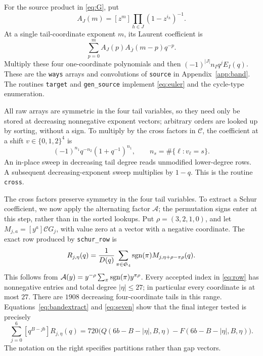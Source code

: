 For the source product in \eqref{eq:G}, put
\[
 A_J(m)=[z^m]\prod_{h\in J}(1-z^{i_h})^{-1}.
\]
At a single tail-coordinate exponent \(m\), its Laurent coefficient is
\[
          \sum_{p=0}^m A_J(p)A_{\bar J}(m-p)q^{-p}.
\]
Multiply these four one-coordinate polynomials and then
\((-1)^{|J|}n_Iq^jE_I(q)\). These are the \texttt{ways} arrays and
convolutions of \texttt{source} in Appendix~\ref{app:band}.
The routines \texttt{target} and \texttt{gen\_source} implement
\eqref{eq:euler} and the cycle-type enumeration.

All raw arrays are symmetric in the four tail variables, so they need
only be stored at decreasing nonnegative exponent vectors; arbitrary
orders are looked up by sorting, without a sign.
To multiply by the cross factors in \(\mathcal C\), the coefficient
at a shift \(v\in\{0,1,2\}^4\) is
\[
                  (-1)^{n_1}q^{-n_2}(1+q^{-1})^{n_1},
       \qquad n_s=\#\{\ell:v_\ell=s\}.
\]
An in-place sweep in decreasing tail degree reads unmodified lower-degree
rows. A subsequent decreasing-exponent sweep multiplies by \(1-q\).
This is the routine \texttt{cross}.

The cross factors preserve symmetry in the four tail variables. To
extract a Schur coefficient, we now apply the alternating factor
\(\mathcal A\); the permutation signs enter at this step, rather than in the
sorted lookups.
Put \(\rho=(3,2,1,0)\), and let \(M_{j,a}=[y^a]\mathcal C G_j\),
with value zero at a vector with a negative coordinate.
The exact row produced by \texttt{schur\_row} is
\begin{equation}\label{eq:row}
 R_{j,\eta}(q)=\frac1{D(q)}
       \sum_{\pi\in\mathfrak S_4}\operatorname{sgn}(\pi)
                     M_{j,\eta+\rho-\pi\rho}(q).
\end{equation}
This follows from
\(\mathcal A(y)=y^{-\rho}\sum_\pi\operatorname{sgn}(\pi)y^{\pi\rho}\).
Every accepted index in \eqref{eq:row} has nonnegative entries and total
degree \(|\eta|\le27\); in particular every coordinate is at most \(27\).
There are \(1908\) decreasing four-coordinate tails in this range.
Equations~\eqref{eq:bandextract} and \eqref{eq:seven} show that the final
integer tested is precisely
\begin{equation}\label{eq:finalinteger}
 \sum_{j=0}^6[q^{B-jb}]R_{j,\eta}(q)
       =720\bigl(Q(6b-B-|\eta|,B,\eta)-F(6b-B-|\eta|,B,\eta)\bigr).
\end{equation}
The notation on the right specifies partitions rather than gap vectors.

